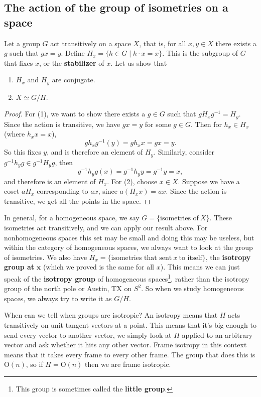 \subsection{The action of the group of isometries on a space}
Let a group $G$ act transitively on a space $X$, that is, for all $x,y \in X$ there exists a $g$ such that $gx=y$. Define $H_x= \{h\in G \mid h\cdot x=x\} $. This is the subgroup of $G$ that fixes $x$, or the \textbf{stabilizer} of $x$. Let us show that
\begin{enumerate}[label=(\arabic*)]
\setlength\itemsep{-.2em}
    \item $H_x$ and $H_y$ are conjugate.
    \item $X\simeq G /H$.
\end{enumerate}
\begin{proof}
    For (1), we want to show there exists a $g \in G$ such that $g H_x g^{-1}=H_y$. Since the action is transitive, we have $gx=y$ for some $g \in G$. Then for $h_x \in H_x$ (where $h_x x=x$), \[
        gh_xg^{-1}(y)=gh_x x=gx=y.
    \] So this fixes $y$, and is therefore an element of $H_y$. Similarly, consider $g^{-1}h_yg \in g^{-1}H_y g$, then \[
    g^{-1}h_y g(x)=g^{-1}h_y y=g^{-1}y=x,
\] and therefore is an element of $H_x$. For (2), choose $x \in X$. Suppose we have a coset $aH_x$ corresponding to $ax$, since $a(H_x x)=ax$. Since the action is transitive, we get all the points in the space.
\end{proof}
In general, for a homogeneous space, we say $G= \{\text{isometries of} \ X\} .$ These isometries act transitively, and we can apply our result above. For nonhomogeneous spaces this set may be small and doing this may be useless, but within the category of homogeneous spaces, we always want to look at the group of isometries. We also have $H_x= \{\text{isometries that sent} \ x \ \text{to itself} \}$, the \textbf{isotropy group at} $\mathbf x$ (which we proved is the same for all $x$). This means we can just speak of the \textbf{isotropy group} of homogeneous spaces\footnote{This group is sometimes called the \textbf{little group}.}, rather than the isotropy group of the north pole or Austin, TX on $S^2$. So when we study homogeneous spaces, we always try to write it as $G /H$. 

When can we tell when groups are isotropic? An isotropy means that $H$ acts transitively on unit tangent vectors at a point. This means that it's big enough to send every vector to another vector, we simply look at $H$ applied to an arbitrary vector and ask whether it hits any other vector. Frame isotropy in this context means that it takes every frame to every other frame. The group that does this is $\mathrm O(n)$, so if $H=\mathrm O(n)$ then we are frame isotropic.

